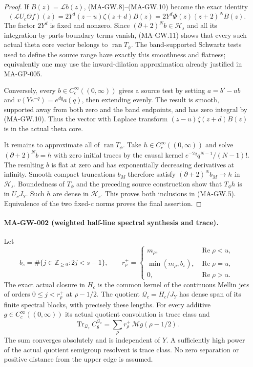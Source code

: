 \begin{proof}
If $B(z)=\mathcal Lb(z)$, (MA-GW.8)--(MA-GW.10) become
the exact identity
\[
             (\mathcal L U_c\Theta f)(z)
                 =2Y^d(z-u)\zeta(z+d)B(z)
                 =2Y^d\Phi(z)(z+2)^N B(z).
 \tag{MA-GW.11}
\]
The factor $2Y^d$ is fixed and nonzero.
Since $(\partial+2)^N b\in\mathcal H_s$ and all its
integration-by-parts boundary terms vanish, (MA-GW.11)
shows that every such actual theta core vector belongs
to $\operatorname{ran}T_\phi$.
The band-supported Schwartz tests used to define the
source range have exactly this smoothness and flatness;
equivalently one may use the inward-dilation approximation
already justified in MA-GP-005.

Conversely, every $b\in C_c^\infty((0,\infty))$ gives a
source test by setting $a=b'-ub$ and
$v(Y e^{-q})=e^{dq}a(q)$, then extending evenly.
The result is smooth, supported away from both zero and
the band endpoints, and has zero integral by (MA-GW.10).
Thus the vector with Laplace transform
$(z-u)\zeta(z+d)B(z)$ is in the actual theta core.

It remains to approximate all of $\operatorname{ran}T_\phi$.
Take $h\in C_c^\infty((0,\infty))$ and solve
$(\partial+2)^N b=h$ with zero initial traces by the
causal kernel $e^{-2q}q^{N-1}/(N-1)!$.
The resulting $b$ is flat at zero and has exponentially
decreasing derivatives at infinity.
Smooth compact truncations $b_M$ therefore satisfy
$(\partial+2)^N b_M\to h$ in $\mathcal H_s$.
Boundedness of $T_\phi$ and the preceding source construction
show that $T_\phi h$ is in $U_cJ_Y$.
Such $h$ are dense in $\mathcal H_s$.
This proves both inclusions in (MA-GW.5).
Equivalence of the two fixed-$c$ norms proves the final assertion.
\end{proof}

\paragraph{MA-GW-002 (weighted half-line spectral synthesis and trace).}
Let
\[
 b_s=\#\{j\in\mathbb Z_{\ge0}:2j<s-1\},\qquad
 r^+_\rho=
 \begin{cases}
 m_\rho,&\operatorname{Re}\rho<u,\\
 \min(m_\rho,b_s),&\operatorname{Re}\rho=u,\\
 0,&\operatorname{Re}\rho>u.
 \end{cases}
 \tag{MA-GW.12}
\]
The exact actual closure in $H_c$ is the common kernel
of the continuous Mellin jets of orders
$0\le j<r^+_\rho$ at $\rho-1/2$.
The quotient $\mathcal Q_c=H_c/J_Y$ has dense span of
its finite spectral blocks, with precisely these lengths.
For every additive $g\in C_c^\infty((0,\infty))$ its
actual quotient convolution is trace class and
\[
       \operatorname{Tr}_{\mathcal Q_c}C_g^{\mathcal Q_c}
           =\sum_\rho r^+_\rho\,\mathcal Mg(\rho-1/2).
 \tag{MA-GW.13}
\]
The sum converges absolutely and is independent of $Y$.
A sufficiently high power of the actual quotient
semigroup resolvent is trace class.
No zero separation or positive distance from the upper
edge is assumed.

